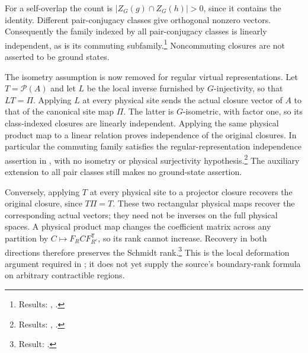 \documentclass{article}
\begin{document}
For a self-overlap the count is $|Z_G(g)\cap Z_G(h)|>0$, since it
contains the identity. Different pair-conjugacy classes give orthogonal
nonzero vectors. Consequently the family indexed by all pair-conjugacy
classes is linearly independent, as is its commuting subfamily.\footnote{Results:
    ,
    .}
Noncommuting closures are not asserted to be ground states.

The isometry assumption is now removed for regular virtual representations.
Let $T=\mathcal P(A)$ and let $L$ be the local inverse furnished by
$G$-injectivity, so that $LT=\Pi$. Applying $L$ at every physical site
sends the actual closure vector of $A$ to that of the canonical site
map $\Pi$. The latter is $G$-isometric, with factor one, so its
class-indexed closures are linearly independent. Applying the same
physical product map to a linear relation proves independence of the
original closures. In particular the commuting family satisfies the
regular-representation independence assertion in
\cite[Theorem~5.9]{Schuch2010PEPS}, with no isometry or physical
surjectivity hypothesis.\footnote{Results:
    ,
    .}
The auxiliary extension to all pair classes
still makes no ground-state assertion.

Conversely, applying $T$ at every physical site to a projector closure
recovers the original closure, since $T\Pi=T$. These two rectangular
physical maps recover the corresponding actual vectors; they need not
be inverses on the full physical spaces. A physical product map changes
the coefficient matrix across any partition by
$C\mapsto F_R C F_{R^c}^{\mathsf T}$, so its rank cannot increase.
Recovery in both directions therefore preserves the Schmidt
rank.\footnote{Result:
    .}
This is the local deformation argument required in
\cite[Corollary~6.10]{Schuch2010PEPS}; it does not yet supply the
source's boundary-rank formula on arbitrary contractible regions.
\end{document}
